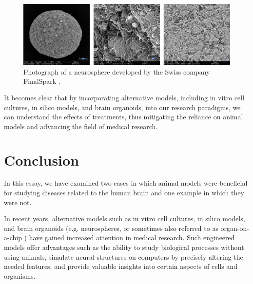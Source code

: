 \documentclass[10pt]{article}
\begin{document}
\begin{sloppypar}
  \vspace{10pt} %
  \begin{figure}[ht]
    \centering
    \includegraphics[width=\textwidth]{figures/neurosphere.png}
    \caption[Photographs of a neurosphere developed by the Swiss company FinalSpark]{Photograph of a neurosphere developed by the Swiss company FinalSpark \citep{finalspark_artificial_2022}.}
    \label{fig:neurospheres}
  \end{figure}

  It becomes clear that by incorporating alternative models, including in vitro cell cultures, in silico models, and brain organoids, into our research paradigms, we can understand the effects of treatments, thus mitigating the reliance on animal models and advancing the field of medical research.

  \section{Conclusion}
  \label{sec:conclusion}

  In this essay, we have examined two cases in which animal models were beneficial for studying diseases related to the human brain and one example in which they were not.

  In recent years, alternative models such as in vitro cell cultures, in silico models, and brain organoids (e.g. neurospheres, or sometimes also referred to as organ-on-a-chip \citep{huh_reconstituting_2010}) have gained increased attention in medical research. Such engineered models offer advantages such as the ability to study biological processes without using animals, simulate neural structures on computers by precisely altering the needed features, and provide valuable insights into certain aspects of cells and organisms.


\end{sloppypar}
\end{document}
